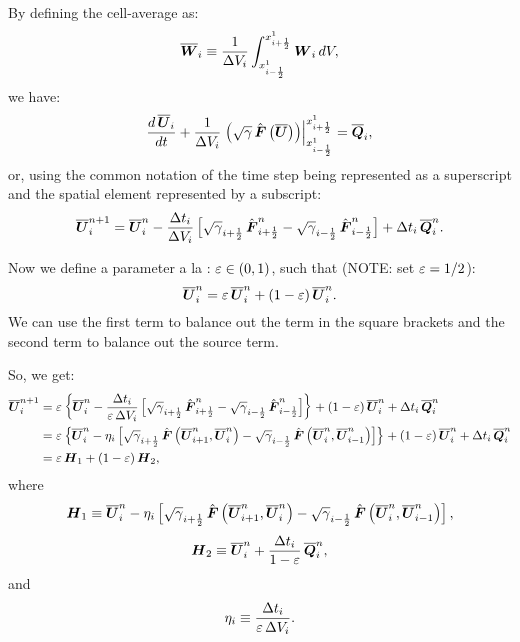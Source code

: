\documentclass[10pt,preprint]{aastex}
\begin{document}
By defining the cell-average as:
\begin{equation}
    \overline{\boldsymbol{W}}_{i}\equiv\frac{1}{\Delta V_{i}}\int_{x^{1}_{i-\frac{1}{2}}}^{x^{1}_{i+\frac{1}{2}}}\boldsymbol{W}_{i}\,dV,
\end{equation}
we have:
\begin{equation}
    \frac{d\,\overline{\boldsymbol{U}}_{i}}{dt}+\frac{1}{\Delta V_{i}}\left.\left(\sqrt{\gamma}\,\hat{\boldsymbol{F}}\left(\overline{\boldsymbol{U}}\right)\right)\right|^{x^{1}_{i+\frac{1}{2}}}_{x^{1}_{i-\frac{1}{2}}}=\overline{\boldsymbol{Q}}_{i},
\end{equation}
or, using the common notation of the time step being represented as a superscript and the spatial element represented by a subscript:
\begin{equation}
    \overline{\boldsymbol{U}}^{n+1}_{i}=\overline{\boldsymbol{U}}^{n}_{i}-\frac{\Delta t_{i}}{\Delta V_{i}}\left[\sqrt{\gamma}_{i+\frac{1}{2}}\,\hat{\boldsymbol{F}}^{n}_{i+\frac{1}{2}}-\sqrt{\gamma}_{i-\frac{1}{2}}\,\hat{\boldsymbol{F}}^{n}_{i-\frac{1}{2}}\right]+\Delta t_{i}\,\overline{\boldsymbol{Q}}^{n}_{i}.
\end{equation}

Now we define a parameter a la \citet{ZS2011b}: $\varepsilon\in\left(0,1\right)$, such that (NOTE: \citet{ZS2011b} set $\varepsilon=1/2$):
\begin{equation}
    \overline{\boldsymbol{U}}^{n}_{i}=\varepsilon\,\overline{\boldsymbol{U}}^{n}_{i}+\left(1-\varepsilon\right)\overline{\boldsymbol{U}}^{n}_{i}.
\end{equation}
We can use the first term to balance out the term in the square brackets and the second term to balance out the source term.

So, we get:
\begin{align}
    \overline{\boldsymbol{U}}^{n+1}_{i}&=\varepsilon\left\{\overline{\boldsymbol{U}}^{n}_{i}-\frac{\Delta t_{i}}{\varepsilon\,\Delta V_{i}}\left[\sqrt{\gamma}_{i+\frac{1}{2}}\,\hat{\boldsymbol{F}}^{n}_{i+\frac{1}{2}}-\sqrt{\gamma}_{i-\frac{1}{2}}\,\hat{\boldsymbol{F}}^{n}_{i-\frac{1}{2}}\right]\right\}+\left(1-\varepsilon\right)\overline{\boldsymbol{U}}^{n}_{i}+\Delta t_{i}\,\overline{\boldsymbol{Q}}^{n}_{i}\\
    &=\varepsilon\left\{\overline{\boldsymbol{U}}^{n}_{i}-\eta_{i}\left[\sqrt{\gamma}_{i+\frac{1}{2}}\,\hat{\boldsymbol{F}}\left(\overline{\boldsymbol{U}}^{n}_{i+1},\overline{\boldsymbol{U}}^{n}_{i}\right)-\sqrt{\gamma}_{i-\frac{1}{2}}\,\hat{\boldsymbol{F}}\left(\overline{\boldsymbol{U}}^{n}_{i},\overline{\boldsymbol{U}}^{n}_{i-1}\right)\right]\right\}+\left(1-\varepsilon\right)\overline{\boldsymbol{U}}^{n}_{i}+\Delta t_{i}\,\overline{\boldsymbol{Q}}^{n}_{i}\\
    &=\varepsilon\,\boldsymbol{H}_{1}+\left(1-\varepsilon\right)\boldsymbol{H}_{2},
\end{align}
where
\begin{equation}
    \boldsymbol{H}_{1}\equiv \overline{\boldsymbol{U}}^{n}_{i}-\eta_{i}\left[\sqrt{\gamma}_{i+\frac{1}{2}}\,\hat{\boldsymbol{F}}\left(\overline{\boldsymbol{U}}^{n}_{i+1},\overline{\boldsymbol{U}}^{n}_{i}\right)-\sqrt{\gamma}_{i-\frac{1}{2}}\,\hat{\boldsymbol{F}}\left(\overline{\boldsymbol{U}}^{n}_{i},\overline{\boldsymbol{U}}^{n}_{i-1}\right)\right],
\end{equation}
\begin{equation}
    \boldsymbol{H}_{2}\equiv\overline{\boldsymbol{U}}^{n}_{i}+\frac{\Delta t_{i}}{1-\varepsilon}\,\overline{\boldsymbol{Q}}^{n}_{i},
\end{equation}
and
\begin{equation}
    \eta_{i}\equiv\frac{\Delta t_{i}}{\varepsilon\,\Delta V_{i}}.
\end{equation}
\end{document}
